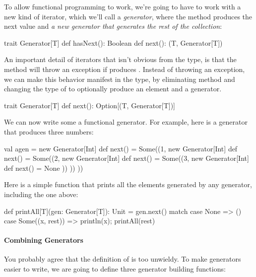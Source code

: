 To allow functional programming to work, we're going to have to work with a new kind of iterator,
which we'll call a \emph{generator}, where the  method produces the next value
and \emph{a new generator that generates the rest of the collection}:
%
\begin{scalacode}
trait Generator[T] {
  def hasNext(): Boolean
  def next(): (T, Generator[T])
}
\end{scalacode}

An important detail of iterators that isn't obvious from the type, is that the  method
will throw an exception if  produces .  Instead of throwing an exception,
we can make this behavior manifest in the type, by eliminating  method and changing the type
of  to optionally produce an element and a generator.
%
\begin{scalacode}
trait Generator[T] {
  def next(): Option[(T, Generator[T])]
}
\end{scalacode}

We can now write some a functional generator. For example, here is a generator that produces three numbers:
\begin{scalacode}
val agen = new Generator[Int] {
  def next() = Some((1, new Generator[Int] {
                          def next() = Some((2, new Generator[Int] {
                                                 def next() = Some((3, new Generator[Int] {
                                                                        def next() = None
                                                                       }))
                                                }))
                        }))
}
\end{scalacode}

Here is a simple function that prints all the elements generated by any generator, including the
one above:
\begin{scalacode}
def printAll[T](gen: Generator[T]): Unit = gen.next() match {
  case None => ()
  case Some((x, rest)) => println(x); printAll(rest)
}
\end{scalacode}

\paragraph{Combining Generators} You probably agree that the definition of  is 
too unwieldy. To make generators easier to write, we are going to define three generator building
functions:

